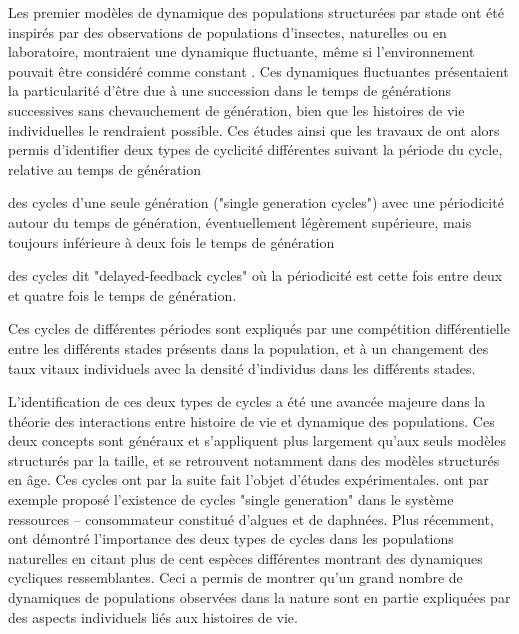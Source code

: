 Les premier modèles de dynamique des populations structurées par stade
\autocite{gurney1980a,gurney1983a,nisbet1983a,lawton1981a} ont été inspirés par
des observations de populations d'insectes, naturelles ou en laboratoire,
montraient une dynamique fluctuante, même si l'environnement pouvait être
considéré comme constant
\autocite{nicholson1954a,gurney1983a,ebenman1988a,godfray1989a}. Ces dynamiques
fluctuantes présentaient la particularité d'être due à une succession dans le
temps de générations successives sans chevauchement de génération, bien que les
histoires de vie individuelles le rendraient possible. Ces études ainsi que les
travaux de \textcite{gurney1985a} ont alors permis d'identifier deux types de
cyclicité différentes suivant la période du cycle, relative au temps de
génération
\begin{enumerate*}[label=(\roman*), before=\unskip{ : }, itemjoin={{ ; }},
itemjoin*={{ ; et }}]
  \item des cycles d'une seule génération ("single generation cycles") avec une
  périodicité autour du temps de génération, éventuellement légèrement
  supérieure, mais toujours inférieure à deux fois le temps de génération
  \item des cycles dit "delayed-feedback cycles" où la périodicité est cette
  fois entre deux et quatre fois le temps de génération. 
\end{enumerate*} 
Ces cycles de différentes périodes sont expliqués par une compétition
différentielle entre les différents stades présents dans la population, et à un
changement des taux vitaux individuels avec la densité d'individus dans les
différents stades.

L'identification de ces deux types de cycles a été une avancée majeure dans la
théorie des interactions entre histoire de vie et dynamique des populations. Ces
deux concepts sont généraux et s'appliquent plus largement qu'aux seuls modèles
structurés par la taille, et se retrouvent notamment dans des modèles structurés
en âge. Ces cycles ont par la suite fait l'objet d'études expérimentales.
\textcite{mccauley1987a} ont par exemple proposé l'existence de cycles "single
generation" dans le système ressources -- consommateur constitué d'algues et de
daphnées. Plus récemment, \textcite{murdoch2002a} ont démontré l'importance des
deux types de cycles dans les populations naturelles en citant plus de cent
espèces différentes montrant des dynamiques cycliques ressemblantes. Ceci a
permis de montrer qu'un grand nombre de dynamiques de populations observées dans
la nature sont en partie expliquées par des aspects individuels liés aux
histoires de vie.

